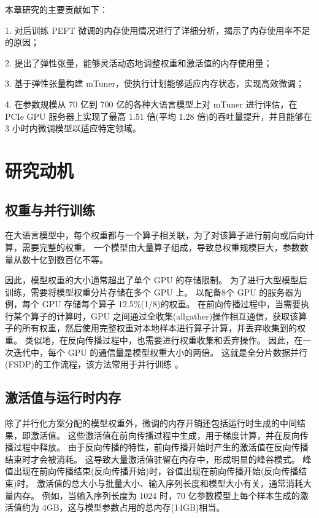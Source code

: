 本章研究的主要贡献如下：

1. 对后训练 PEFT 微调的内存使用情况进行了详细分析，揭示了内存使用率不足的原因；

2. 提出了弹性张量，能够灵活动态地调整权重和激活值的内存使用量；

3. 基于弹性张量构建 mTuner，使执行计划能够适应内存状态，实现高效微调；

4. 在参数规模从 70 亿到 700 亿的各种大语言模型上对 mTuner 进行评估，在 PCIe GPU 服务器上实现了最高 1.51 倍(平均 1.28 倍)的吞吐量提升，并且能够在 3 小时内微调模型以适应特定领域。

\section{研究动机}

\subsection{权重与并行训练}
在大语言模型中，每个权重都与一个算子相关联，为了对该算子进行前向或后向计算，需要完整的权重。
一个模型由大量算子组成，导致总权重规模巨大，参数数量从数十亿到数百亿不等。

因此，模型权重的大小通常超出了单个 GPU 的存储限制。
为了进行大型模型后训练，需要将模型权重分片存储在多个 GPU 上。
以配备8个 GPU 的服务器为例，每个 GPU 存储每个算子 12.5\%(1/8)的权重。
在前向传播过程中，当需要执行某个算子的计算时，GPU 之间通过全收集(allgather)操作相互通信，获取该算子的所有权重，然后使用完整权重对本地样本进行算子计算，并丢弃收集到的权重。
类似地，在反向传播过程中，也需要进行权重收集和丢弃操作。
因此，在一次迭代中，每个 GPU 的通信量是模型权重大小的两倍。
这就是全分片数据并行(FSDP)\cite{TorchFSDP}的工作流程，该方法常用于并行训练 \cite{rasley2020DeepSpeed,fan2021dapple}。

\subsection{激活值与运行时内存}
除了并行化方案分配的模型权重外，微调的内存开销还包括运行时生成的中间结果，即激活值。
这些激活值在前向传播过程中生成，用于梯度计算，并在反向传播过程中释放。
由于反向传播的特性，前向传播开始时产生的激活值在反向传播结束时才会被消耗。
这导致大量激活值驻留在内存中，形成明显的峰谷模式。
峰值出现在前向传播结束(反向传播开始)时，谷值出现在前向传播开始(反向传播结束)时。
激活值的总大小与批量大小、输入序列长度和模型大小有关，通常消耗大量内存。
例如，当输入序列长度为 1024 时，70 亿参数模型上每个样本生成的激活值约为 4GB，这与模型参数占用的总内存(14GB)相当。

